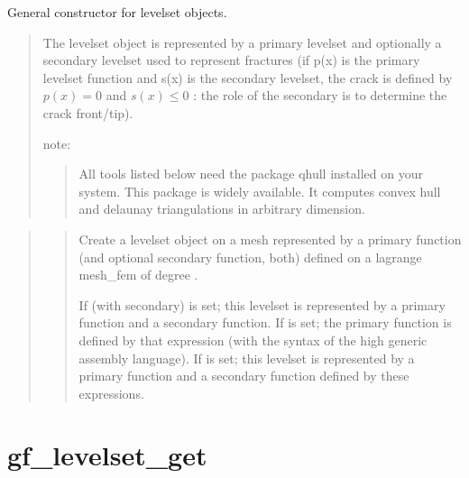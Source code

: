 \documentclass[a4paper,11pt,english]{sphinxmanual}
\begin{document}
General constructor for levelset objects.
\begin{quote}

The level\sphinxhyphen{}set object is represented by a primary level\sphinxhyphen{}set and optionally
a secondary level\sphinxhyphen{}set used to represent fractures (if p(x) is the primary
level\sphinxhyphen{}set function and s(x) is the secondary level\sphinxhyphen{}set, the crack is
defined by \(p(x)=0\) and \(s(x)\leq0\) : the role of the secondary is to determine
the crack front/tip).

note:
\begin{quote}

All tools listed below need the package qhull installed on your
system. This package is widely available. It computes convex hull and
delaunay triangulations in arbitrary dimension.
\end{quote}
\end{quote}

\begin{quote}

\begin{quote}

Create a levelset object on a mesh represented by a primary function
(and optional secondary function, both) defined on a lagrange mesh\_fem of
degree .

If  (with secondary) is set; this levelset is represented by a
primary function and a secondary function. If  is set; the primary
function is defined by that expression (with the syntax of the high
generic assembly language). If  is set; this levelset
is represented by a primary function and a secondary function defined
by these expressions.
\end{quote}
\end{quote}


\section{gf\_levelset\_get}
\label{\detokenize{matlab_octave/cmdref_gf_levelset_get:gf-levelset-get}}\label{\detokenize{matlab_octave/cmdref_gf_levelset_get::doc}}
\end{document}
